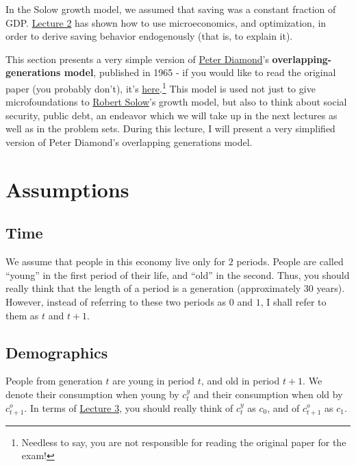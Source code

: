 \documentclass[]{book}
\let\rmarkdownfootnote\footnote%
\def\footnote{\protect\rmarkdownfootnote}
\theoremstyle{definition}
\theoremstyle{definition}
\theoremstyle{definition}
\theoremstyle{remark}
\begin{document}
In the Solow growth model, we assumed that saving was a constant
fraction of GDP. \protect\hyperlink{solow}{Lecture 2} has shown how to
use microeconomics, and optimization, in order to derive saving behavior
endogenously (that is, to explain it).

This section presents a very simple version of
\href{https://en.wikipedia.org/wiki/Peter_Diamond}{Peter Diamond}'s
\textbf{overlapping-generations model}, published in 1965 - if you would
like to read the original paper (you probably don't), it's
\href{https://www.jstor.org/stable/1809231}{here}.\footnote{Needless to
  say, you are not responsible for reading the original paper for the
  exam!} This model is used not just to give microfoundations to
\href{https://en.wikipedia.org/wiki/Robert_Solow}{Robert Solow}'s growth
model, but also to think about social security, public debt, an endeavor
which we will take up in the next lectures as well as in the problem
sets. During this lecture, I will present a very simplified version of
Peter Diamond's overlapping generations model.

\section{Assumptions}\label{assumptions-2}

\subsection{Time}\label{time}

We assume that people in this economy live only for \(2\) periods.
People are called ``young'' in the first period of their life, and
``old'' in the second. Thus, you should really think that the length of
a period is a generation (approximately 30 years). However, instead of
referring to these two periods as \(0\) and \(1\), I shall refer to them
as \(t\) and \(t+1\).

\subsection{Demographics}\label{demographics}

People from generation \(t\) are young in period \(t\), and old in
period \(t+1\). We denote their consumption when young by \(c_{t}^{y}\)
and their consumption when old by \(c_{t+1}^{o}\). In terms of
\protect\hyperlink{two-period}{Lecture 3}, you should really think of
\(c_{t}^{y}\) as \(c_{0}\), and of \(c_{t+1}^{o}\) as \(c_{1}\).
\end{document}
